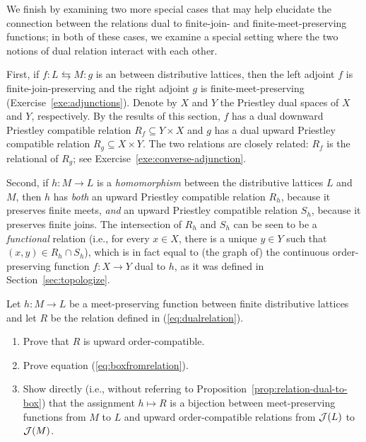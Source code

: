 We finish by examining two more special cases that may help elucidate the connection between the relations dual to finite-join- and finite-meet-preserving functions; in both of these cases, we examine a special setting where the two notions of dual relation interact with each other. 

First, if $f \colon L \leftrightarrows M \colon g$ is an  between distributive lattices, then the left adjoint $f$ is finite-join-preserving and the right adjoint $g$ is finite-meet-preserving (Exercise~\ref{exe:adjunctions}). Denote by $X$ and $Y$ the Priestley dual spaces of $X$ and $Y$, respectively. By the results of this section, $f$ has a dual downward Priestley compatible relation $R_f \subseteq Y \times X$ and $g$ has a dual upward Priestley compatible relation $R_g \subseteq X \times Y$. The two relations are closely related: $R_f$ is the relational  of $R_g$; see Exercise~\ref{exe:converse-adjunction}. 

Second, if $h \colon M \to L$ is a \emph{homomorphism} between the distributive lattices $L$ and $M$, then $h$ has \emph{both} an upward Priestley compatible relation $R_h$, because it preserves finite meets, \emph{and} an upward Priestley compatible relation $S_h$, because it preserves finite joins. The intersection of $R_h$ and $S_h$ can be seen to be a \emph{functional} relation (i.e., for every $x \in X$, there is a unique $y \in Y$ such that $(x,y) \in R_h \cap S_h$), which is in fact equal to (the graph of) the continuous order-preserving function $f \colon X \to Y$ dual to $h$, as it was defined in Section~\ref{sec:topologize}.

\exercises
\begin{exercise}\label{exe:finiterelationduality}
Let $h \colon M \to L$ be a meet-preserving function between finite distributive lattices and let $R$ be the relation defined in (\ref{eq:dualrelation}).
\begin{enumerate}
	\item Prove that $R$ is upward order-compatible.
	\item Prove equation (\ref{eq:boxfromrelation}).
	\item Show directly (i.e., without referring to Proposition~\ref{prop:relation-dual-to-box}) that the assignment $h \mapsto R$ is a bijection between meet-preserving functions from $M$ to $L$ and upward order-compatible relations from $\mathcal{J}(L)$ to $\mathcal{J}(M)$.
\end{enumerate}
\end{exercise}

